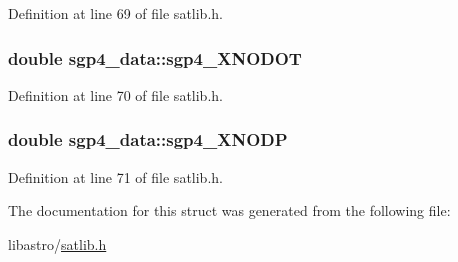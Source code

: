 Definition at line 69 of file satlib.\-h.

\hypertarget{structsgp4__data_a1df1672740828f8481b6d7d26b1ebdfe}{
\subsubsection[{sgp4\-\_\-\-X\-N\-O\-D\-O\-T}]{\setlength{\rightskip}{0pt plus 5cm}double sgp4\-\_\-data\-::sgp4\-\_\-\-X\-N\-O\-D\-O\-T}}\label{structsgp4__data_a1df1672740828f8481b6d7d26b1ebdfe}


Definition at line 70 of file satlib.\-h.

\hypertarget{structsgp4__data_aeb109a0e09007ac3446353b14f6e7162}{
\subsubsection[{sgp4\-\_\-\-X\-N\-O\-D\-P}]{\setlength{\rightskip}{0pt plus 5cm}double sgp4\-\_\-data\-::sgp4\-\_\-\-X\-N\-O\-D\-P}}\label{structsgp4__data_aeb109a0e09007ac3446353b14f6e7162}


Definition at line 71 of file satlib.\-h.



The documentation for this struct was generated from the following file\-:\begin{DoxyCompactItemize}
\item 
libastro/\hyperlink{satlib_8h}{satlib.\-h}\end{DoxyCompactItemize}
